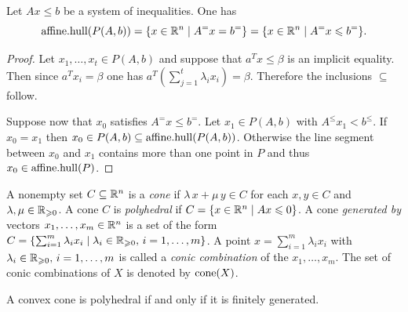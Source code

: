 \begin{lemma}
  \label{po:lem:2}
  Let $Ax\leq b$ be a system of inequalities. One has 
  \begin{displaymath}
    \mathrm{affine.hull}(P(A,b)) = \{ x \in \mathbb{R}^n \mid A^=x = b^=\} = \{ x \in \mathbb{R}^n \mid A^=x\leqslant b^=\}.
  \end{displaymath}
\end{lemma}
\begin{proof}
  Let $x_1,\ldots,x_t \in P(A,b)$ and suppose that $a^Tx\leq\beta$ is an
  implicit equality. Then since $a^Tx_i = \beta$ one has
  $a^T(\sum_{j=1}^t\lambda_ix_i) = \beta$. Therefore the inclusions $\subseteq$
  follow. 

  Suppose now that $x_0$ satisfies $A^=x\leq b^=$. Let $x_1 \in P(A,b)$
  with $A^\leq x_1<b^\leq$. If $x_0=x_1$ then $x_0 \in P(A,b) \subseteq
  \mathrm{affine.hull}(P(A,b))$.  Otherwise the line segment between $x_0$ and
  $x_1$ contains more than one point in $P$ and thus $x_0 \in
  \mathrm{affine.hull}(P)$. 
\end{proof}








A nonempty set  $C\subseteq\mathbb{R}^n$ is a \emph{cone} if $\lambda\, x + \mu\,y \in C$
for each $x,y\in C$ and $\lambda,\mu\in \mathbb{R}_{\geqslant0}$. A cone  $C$ is \emph{polyhedral}
if $C = \{ x \in \mathbb{R}^n \mid Ax\leqslant0\}$. A cone \emph{generated by} vectors
$x_1,\ldots,x_m \in \mathbb{R}^n$ is a set of the form $C = \{ \sum_{i=1}^m \lambda_i x_i
\mid \lambda_i\in \mathbb{R}_{\geqslant0}, \, i=1,\ldots,m\}$.   A point $x = \sum_{i=1}^m \lambda_i x_i$
with  $\lambda_i\in \mathbb{R}_{\geqslant0}, \, i=1,\ldots,m$ is called a \emph{conic
  combination}   of the $x_1,\ldots,x_m$. The set of conic combinations of
$X$ is denoted by $\mathrm{cone}(X)$. 


\begin{theorem}
  \label{po:thr:3}
  A convex cone is polyhedral if and only if it is finitely
  generated. 
\end{theorem}


